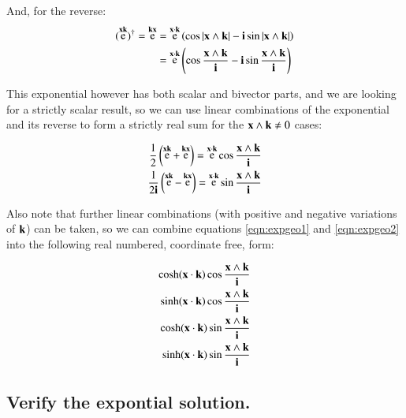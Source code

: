 \documentclass{article}      %
\DeclareMathOperator{\Exp}{e}
\begin{document}
And, for the reverse:
\begin{align*}
(\Exp^{\Bx\Bk})^\dagger = \Exp^{\Bk\Bx}
&= \Exp^{\Bx \cdot \Bk} \left( \cos{\abs{\Bx \wedge \Bk}} - \Bi \sin{\abs{\Bx \wedge \Bk}} \right) \\
&= \Exp^{\Bx \cdot \Bk} \left( \cos{\frac{\Bx \wedge \Bk}{\Bi}} - \Bi \sin{\frac{\Bx \wedge \Bk}{\Bi}} \right) \\
\end{align*}

This exponential however has both scalar and bivector parts, and we are looking for a strictly scalar result, so we can use linear combinations of the
exponential and its reverse to form a strictly real sum for the $\mathbf{x} \wedge \mathbf{k} \ne 0$ cases:

\begin{align*}
\inv{2}\left(\Exp^{\Bx\Bk} + \Exp^{\Bk\Bx}\right) = \Exp^{\Bx\cdot\Bk}\cos{\frac{\Bx \wedge \Bk}{\Bi}} \\
\inv{2\Bi}\left(\Exp^{\Bx\Bk} - \Exp^{\Bk\Bx}\right) = \Exp^{\Bx\cdot\Bk}\sin{\frac{\Bx \wedge \Bk}{\Bi}} \\
\end{align*}

Also note that further linear combinations (with positive and negative variations of $\mathbf{k}$) can be taken, so we can
combine equations \ref{eqn:expgeo1} and \ref{eqn:expgeo2} into the following real numbered, coordinate free, form:

\begin{align*}
\cosh(\mathbf{x}\cdot\mathbf{k})\cos{\frac{\mathbf{x}\wedge \mathbf{k}}{\mathbf{i}}} \\
\sinh(\mathbf{x}\cdot\mathbf{k})\cos{\frac{\mathbf{x}\wedge \mathbf{k}}{\mathbf{i}}} \\
\cosh(\mathbf{x}\cdot\mathbf{k})\sin{\frac{\mathbf{x}\wedge \mathbf{k}}{\mathbf{i}}} \\
\sinh(\mathbf{x}\cdot\mathbf{k})\sin{\frac{\mathbf{x}\wedge \mathbf{k}}{\mathbf{i}}} \\
\end{align*}

\subsection{ Verify the expontial solution. }

\end{document}

